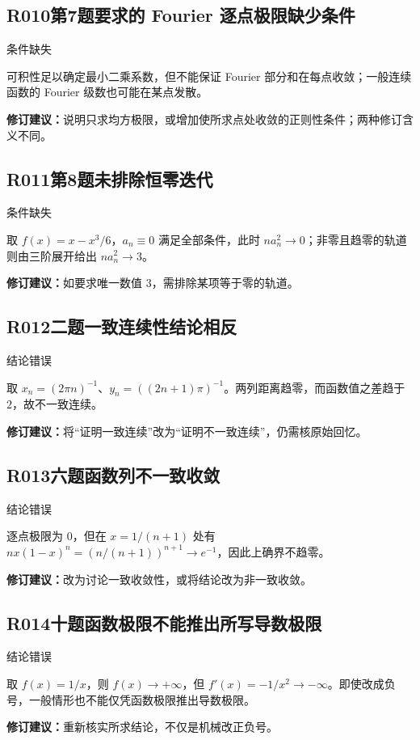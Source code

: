 \subsection*{R010\quad 第7题要求的 Fourier 逐点极限缺少条件}
\noindent{}\quad 条件缺失\par
可积性足以确定最小二乘系数，但不能保证 Fourier 部分和在每点收敛；一般连续函数的 Fourier 级数也可能在某点发散。
\par\textbf{修订建议：}说明只求均方极限，或增加使所求点处收敛的正则性条件；两种修订含义不同。\par
{}
\subsection*{R011\quad 第8题未排除恒零迭代}
\noindent{}\quad 条件缺失\par
取 $f(x)=x-x^3/6$，$a_n\equiv0$ 满足全部条件，此时 $na_n^2\to0$；非零且趋零的轨道则由三阶展开给出 $na_n^2\to3$。
\par\textbf{修订建议：}如要求唯一数值 $3$，需排除某项等于零的轨道。\par
{}
\subsection*{R012\quad 二题一致连续性结论相反}
\noindent{}\quad 结论错误\par
取 $x_n=(2\pi n)^{-1}$、$y_n=((2n+1)\pi)^{-1}$。两列距离趋零，而函数值之差趋于 $2$，故不一致连续。
\par\textbf{修订建议：}将“证明一致连续”改为“证明不一致连续”，仍需核原始回忆。\par
{}
\subsection*{R013\quad 六题函数列不一致收敛}
\noindent{}\quad 结论错误\par
逐点极限为 $0$，但在 $x=1/(n+1)$ 处有 $nx(1-x)^n=(n/(n+1))^{n+1}\to e^{-1}$，因此上确界不趋零。
\par\textbf{修订建议：}改为讨论一致收敛性，或将结论改为非一致收敛。\par
{}
\subsection*{R014\quad 十题函数极限不能推出所写导数极限}
\noindent{}\quad 结论错误\par
取 $f(x)=1/x$，则 $f(x)\to+\infty$，但 $f'(x)=-1/x^2\to-\infty$。即使改成负号，一般情形也不能仅凭函数极限推出导数极限。
\par\textbf{修订建议：}重新核实所求结论，不仅是机械改正负号。\par
{}
